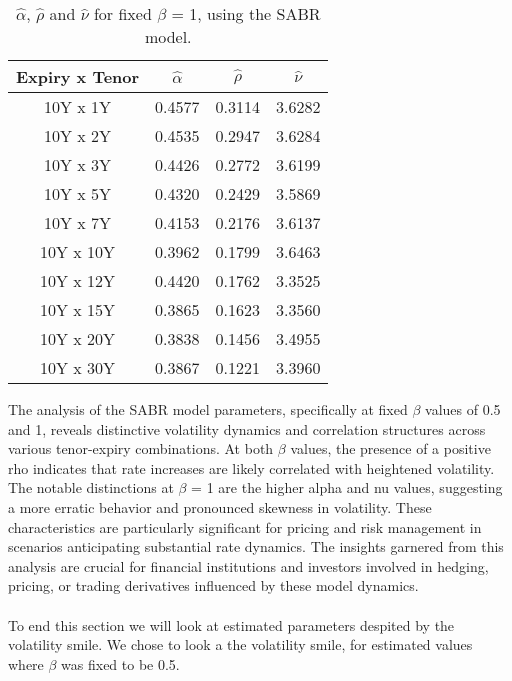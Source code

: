 \noindent

\begin{table}[H]
    \centering
    \begin{tabular}{cccc}
      \toprule
      \textbf{Expiry x Tenor} & \textbf{$\hat{\alpha}$} & \textbf{$\hat{\rho}$}  & \textbf{$\hat{\nu}$}\\
      \midrule
      \rowcolor{lightgray!40} 10Y x 1Y &0.4577 & 0.3114 & 3.6282 \\
      10Y x 2Y  &0.4535 & 0.2947 & 3.6284 \\
      \rowcolor{lightgray!40} 10Y x 3Y  &0.4426 & 0.2772 & 3.6199\\
      10Y x 5Y  &0.4320 & 0.2429 & 3.5869 \\
      \rowcolor{lightgray!40} 10Y x 7Y  &0.4153 & 0.2176 & 3.6137 \\
      10Y x 10Y &0.3962& 0.1799 & 3.6463 \\
      \rowcolor{lightgray!40} 10Y x 12Y &0.4420 & 0.1762 & 3.3525\\
      10Y x 15Y & 0.3865 & 0.1623 & 3.3560 \\
      \rowcolor{lightgray!40} 10Y x 20Y &0.3838 & 0.1456 & 3.4955 \\
      10Y x 30Y &0.3867 & 0.1221 & 3.3960 \\
      \bottomrule
    \end{tabular}
    \caption{$\hat{\alpha}$, $\hat{\rho}$ and $\hat{\nu}$ for fixed $\beta$ = 1, using the SABR model.}
    \label{tab:beta_1}
\end{table}
\noindent
The analysis of the SABR model parameters, specifically at fixed $\beta$ values of 0.5 and 1, 
reveals distinctive volatility dynamics and correlation structures across various tenor-expiry combinations. 
At both $\beta$ values, the presence of a positive rho indicates that rate increases are likely correlated with heightened volatility.
The notable distinctions at $\beta$ = 1 are the higher alpha and nu values, suggesting a more erratic behavior and pronounced 
skewness in volatility. These characteristics are particularly significant for pricing and risk management in scenarios 
anticipating substantial rate dynamics. The insights garnered from this analysis are crucial for financial institutions and 
investors involved in hedging, pricing, or trading derivatives influenced by these model dynamics.
\\\\
To end this section we will look at estimated parameters despited by the volatility smile. 
We chose to look a the volatility smile, for estimated values where $\beta$ was fixed to be 0.5. 

